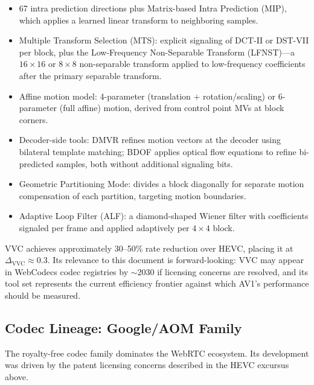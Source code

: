 \begin{itemize}
\item 67 intra prediction directions plus Matrix-based Intra Prediction
  (MIP), which applies a learned linear transform to neighboring samples.

\item Multiple Transform Selection (MTS): explicit signaling of DCT-II or
  DST-VII per block, plus the Low-Frequency Non-Separable Transform
  (LFNST)---a $16\!\times\!16$ or $8\!\times\!8$ non-separable transform
  applied to low-frequency coefficients after the primary separable
  transform.

\item Affine motion model: 4-parameter (translation $+$ rotation/scaling)
  or 6-parameter (full affine) motion, derived from control point MVs at
  block corners.

\item Decoder-side tools: DMVR refines motion vectors at the decoder using
  bilateral template matching; BDOF applies optical flow equations to
  refine bi-predicted samples, both without additional signaling bits.

\item Geometric Partitioning Mode: divides a block diagonally for separate
  motion compensation of each partition, targeting motion boundaries.

\item Adaptive Loop Filter (ALF): a diamond-shaped Wiener filter with
  coefficients signaled per frame and applied adaptively per
  $4\!\times\!4$ block.
\end{itemize}

VVC achieves approximately 30--50\% rate reduction over HEVC, placing it at
$\Delta_{\text{VVC}} \approx 0.3$. Its relevance to this document is
forward-looking: VVC may appear in WebCodecs codec registries by
${\sim}$2030 if licensing concerns are resolved, and its tool set
represents the current efficiency frontier against which AV1's performance
should be measured.

\subsection{Codec Lineage: Google/AOM Family}
\label{sec:aom-lineage}

The royalty-free codec family dominates the WebRTC ecosystem. Its
development was driven by the patent licensing concerns described in the
HEVC excursus above.

